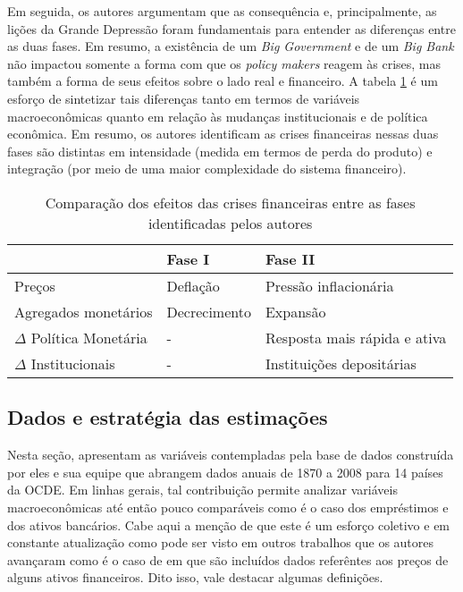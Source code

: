 \documentclass[11pt]{article}
\begin{document}
Em seguida, os autores argumentam que as consequência e, principalmente, as lições da Grande Depressão foram fundamentais para entender as diferenças entre as duas fases.
Em resumo, a existência de um \emph{Big Government} e de um \emph{Big Bank} não impactou somente a forma com que os \emph{policy makers} reagem às crises, mas também a forma de seus efeitos sobre o lado real e financeiro.
A tabela \ref{tab:comparacao} é um esforço de sintetizar tais diferenças tanto em termos de variáveis macroeconômicas quanto em relação às mudanças institucionais e de política econômica.
Em resumo, os autores identificam as crises financeiras nessas duas fases são distintas em intensidade (medida em termos de perda do produto) e integração (por meio de uma maior complexidade do sistema financeiro).

\begin{table}[htbp]
\caption{\label{tab:comparacao}Comparação dos efeitos das crises financeiras entre as fases identificadas pelos autores}
\centering
\begin{tabular}{lll}
\hline
 & Fase I & Fase II\\
\hline
Preços & Deflação & Pressão inflacionária\\
Agregados monetários & Decrecimento & Expansão\\
\(\Delta\) Política Monetária & - & Resposta mais rápida e ativa\\
\(\Delta\) Institucionais & - & Instituições depositárias\\
\hline
\end{tabular}
\end{table}


\subsection*{Dados e estratégia das estimações}
\label{sec:org5641f2a}


Nesta seção, \textcite{schularickCreditBoomsGone2012} apresentam as variáveis contempladas pela base de dados construída por eles e sua equipe que abrangem dados anuais de 1870 a 2008 para 14 países da OCDE.
Em linhas gerais, tal contribuição permite analizar variáveis macroeconômicas até então pouco comparáveis como é o caso dos empréstimos e dos ativos bancários.
Cabe aqui a menção de que este é um esforço coletivo e em constante atualização como pode ser visto em outros trabalhos que os autores avançaram como é o caso de \textcite{jordaRateReturnEverything2019} em que são incluídos dados referêntes aos preços de alguns ativos financeiros.
Dito isso, vale destacar algumas definições.
\end{document}
